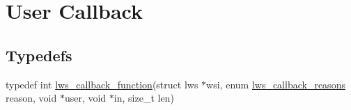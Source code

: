 \hypertarget{group__usercb}{}\section{User Callback}
\label{group__usercb}
\subsection*{Typedefs}
\begin{DoxyCompactItemize}
\item 
typedef int \hyperlink{group__usercb_gad4fcb82e68d60ffacca61a3f783a0a2f}{lws\+\_\+callback\+\_\+function}(struct lws $\ast$wsi, enum \hyperlink{group__usercb_gad62860e19975ba4c4af401c3cdb6abf7}{lws\+\_\+callback\+\_\+reasons} reason, void $\ast$user, void $\ast$in, size\+\_\+t len)
\end{DoxyCompactItemize}
